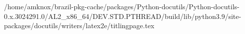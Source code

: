 /home/amknox/brazil-pkg-cache/packages/Python-docutils/Python-docutils-0.x.3024291.0/AL2_x86_64/DEV.STD.PTHREAD/build/lib/python3.9/site-packages/docutils/writers/latex2e/titlingpage.tex